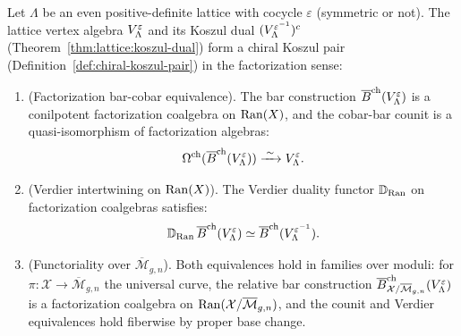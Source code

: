 \begin{theorem}
\label{thm:lattice:factorization-koszul}
Let $\Lambda$ be an even positive-definite lattice with cocycle
$\varepsilon$ \textup{(}symmetric or not\textup{)}.  The lattice
vertex algebra $V_\Lambda^\varepsilon$ and its Koszul dual
$(V_\Lambda^{\varepsilon^{-1}})^c$
\textup{(}Theorem~\textup{\ref{thm:lattice:koszul-dual})} form a
chiral Koszul pair
\textup{(}Definition~\textup{\ref{def:chiral-koszul-pair})} in
the factorization sense:
\begin{enumerate}[label=(\roman*)]
\item \textup{(}Factorization bar-cobar equivalence\textup{).}
  The bar construction
  $\overline{B}^{\mathrm{ch}}(V_\Lambda^\varepsilon)$ is a conilpotent
  factorization coalgebra on $\operatorname{Ran}(X)$, and the cobar-bar counit
  is a quasi-isomorphism of factorization algebras:
  \begin{equation}\label{eq:lattice:fact-bar-cobar}
  \Omega^{\mathrm{ch}}(\overline{B}^{\mathrm{ch}}(V_\Lambda^\varepsilon))
  \xrightarrow{\;\sim\;}
  V_\Lambda^\varepsilon.
  \end{equation}
\item \textup{(}Verdier intertwining on $\operatorname{Ran}(X)$\textup{).}
  The Verdier duality functor
  $\mathbb{D}_{\operatorname{Ran}}$ on factorization coalgebras satisfies:
  \begin{equation}\label{eq:lattice:verdier-ran}
  \mathbb{D}_{\operatorname{Ran}}\, \overline{B}^{\mathrm{ch}}(V_\Lambda^\varepsilon)
  \simeq
  \overline{B}^{\mathrm{ch}}(V_\Lambda^{\varepsilon^{-1}}).
  \end{equation}
\item \textup{(}Functoriality over $\overline{\mathcal{M}}_{g,n}$\textup{).}
  Both equivalences hold in families over moduli: for
  $\pi\colon \mathcal{X} \to \overline{\mathcal{M}}_{g,n}$ the universal curve,
  the relative bar construction
  $\overline{B}^{\mathrm{ch}}_{\mathcal{X}/\overline{\mathcal{M}}_{g,n}}
  (V_\Lambda^\varepsilon)$ is a factorization coalgebra on
  $\operatorname{Ran}(\mathcal{X}/\overline{\mathcal{M}}_{g,n})$, and the counit and Verdier
  equivalences hold fiberwise by proper base change.
\end{enumerate}
\end{theorem}

